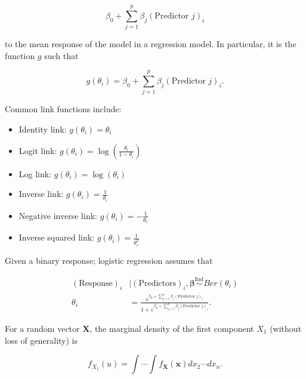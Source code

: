 \documentclass[
  letterpaper,
  DIV=11,
  numbers=noendperiod]{scrreprt}
\providecommand{\tightlist}{%
  \setlength{\itemsep}{0pt}\setlength{\parskip}{0pt}}\usepackage{longtable,booktabs,array}
\theoremstyle{definition}
\theoremstyle{plain}
\theoremstyle{definition}
\theoremstyle{remark}
\begin{document}
\[\beta_0 + \sum_{j=1}^{p} \beta_j (\text{Predictor } j)_i\]

to the mean response of the model in a regression model. In particular,
it is the function \(g\) such that

\[g\left(\theta_i\right) = \beta_0 + \sum_{j=1}^{p} \beta_j (\text{Predictor } j)_i.\]

Common link functions include:

\begin{itemize}
\tightlist
\item
  Identity link: \(g\left(\theta_i\right) = \theta_i\)
\item
  Logit link:
  \(g\left(\theta_i\right) = \log\left(\frac{\theta_i}{1 - \theta_i}\right)\)
\item
  Log link: \(g\left(\theta_i\right) = \log\left(\theta_i\right)\)
\item
  Inverse link: \(g\left(\theta_i\right) = \frac{1}{\theta_i}\)
\item
  Negative inverse link:
  \(g\left(\theta_i\right) = -\frac{1}{\theta_i}\)
\item
  Inverse squared link:
  \(g\left(\theta_i\right) = \frac{1}{\theta_i^2}\)
\end{itemize}

\begin{description}
\tightlist
\item[Logistic Regression (Definition~\ref{def-logistic-regression})]
Given a binary response; logistic regression assumes that
\end{description}

\[
\begin{aligned}
  (\text{Response})_i &\mid (\text{Predictors})_i, \boldsymbol{\beta} \stackrel{\text{Ind}}{\sim}Ber\left(\theta_i\right) \\
  \theta_i &= \frac{e^{\beta_0 + \sum_{j=1}^{p} \beta_j (\text{Predictor } j)_i}}{1 + e^{\beta_0 + \sum_{j=1}^{p} \beta_j (\text{Predictor } j)_i}}.
\end{aligned}
\]

\begin{description}
\tightlist
\item[Marginal Density (Definition~\ref{def-marginal-density})]
For a random vector \(\mathbf{X}\), the marginal density of the first
component \(X_1\) (without loss of generality) is
\end{description}

\[f_{X_1}(u) = \int \dotsi \int f_{\mathbf{X}}(\mathbf{x}) dx_2 \dotsb dx_n.\]
\end{document}
